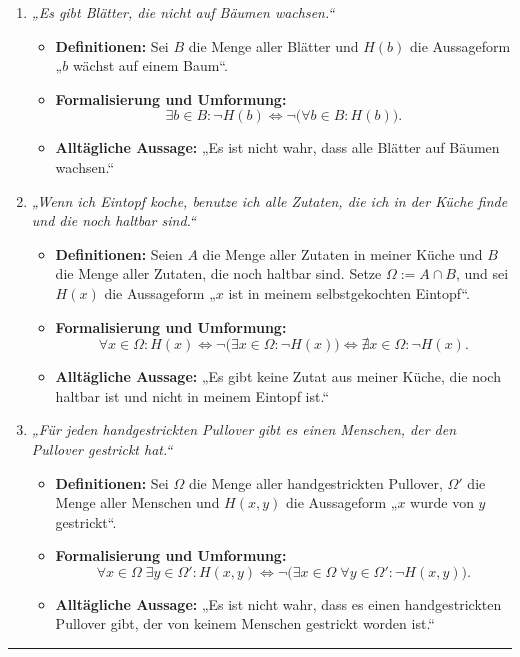 \begin{enumerate}
    \item \emph{„Es gibt Blätter, die nicht auf Bäumen wachsen.“}
    \begin{itemize}
        \item \textbf{Definitionen:} Sei $B$ die Menge aller Blätter und $H(b)$ die Aussageform „$b$ wächst auf einem Baum“.
        \item \textbf{Formalisierung und Umformung:}
        \[
            \exists b\in B : \neg H(b)
            \iff \neg\bigl(\forall b\in B : H(b)\bigr).
        \]
        \item \textbf{Alltägliche Aussage:} „Es ist nicht wahr, dass alle Blätter auf Bäumen wachsen.“
    \end{itemize}

    \item \emph{„Wenn ich Eintopf koche, benutze ich alle Zutaten, die ich in der Küche finde und die noch haltbar sind.“}
    \begin{itemize}
        \item \textbf{Definitionen:} Seien $A$ die Menge aller Zutaten in meiner Küche und $B$ die Menge aller Zutaten, die noch haltbar sind. Setze $\Omega := A\cap B$, und sei $H(x)$ die Aussageform „$x$ ist in meinem selbstgekochten Eintopf“.
        \item \textbf{Formalisierung und Umformung:}
        \[
            \forall x\in\Omega : H(x)
            \iff \neg\bigl(\exists x\in\Omega : \neg H(x)\bigr)
            \iff \nexists x\in\Omega : \neg H(x).
        \]
        \item \textbf{Alltägliche Aussage:} „Es gibt keine Zutat aus meiner Küche, die noch haltbar ist und nicht in meinem Eintopf ist.“
    \end{itemize}

    \item \emph{„Für jeden handgestrickten Pullover gibt es einen Menschen, der den Pullover gestrickt hat.“}
    \begin{itemize}
        \item \textbf{Definitionen:} Sei $\Omega$ die Menge aller handgestrickten Pullover, $\Omega'$ die Menge aller Menschen und $H(x,y)$ die Aussageform „$x$ wurde von $y$ gestrickt“.
        \item \textbf{Formalisierung und Umformung:}
        \[
            \forall x\in\Omega\;\exists y\in\Omega' : H(x,y)
            \iff \neg\bigl(\exists x\in\Omega\;\forall y\in\Omega' : \neg H(x,y)\bigr).
        \]
        \item \textbf{Alltägliche Aussage:} „Es ist nicht wahr, dass es einen handgestrickten Pullover gibt, der von keinem Menschen gestrickt worden ist.“
    \end{itemize}
\end{enumerate}

\vspace{0.8em}
\hrule
\vspace{1em}
